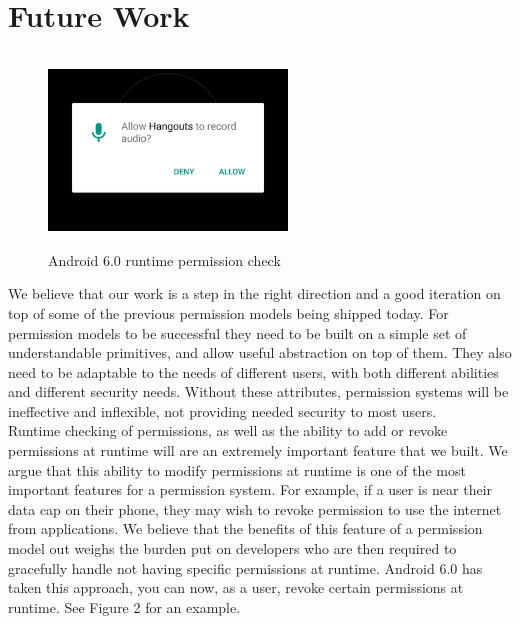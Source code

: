 \section{Future Work}\label{section:futurework}

\begin{figure}[h]
\centering
\includegraphics[height=2in, width=2.5in]{app.png}
\caption{Android 6.0 runtime permission check}
\end{figure}

We believe that our work is a step in the right direction and a good iteration on top of some of the previous permission models being shipped today. 
For permission models to be successful they need to be built on a simple set of understandable primitives, and allow useful abstraction on top of them.
They also need to be adaptable to the needs of different users, with both different abilities and different security needs.
Without these attributes, permission systems will be ineffective and inflexible, not providing needed security to most users.
\\
Runtime checking of permissions, as well as the ability to add or revoke permissions at runtime will are an extremely important feature that we built. We argue that this ability to modify permissions at runtime is one of the most important features for a permission system. For example, if a user is near their data cap on their phone, they may wish to revoke permission to use the internet from applications. We believe that the benefits of this feature of a permission model out weighs the burden put on developers who are then required to gracefully handle not having specific permissions at runtime. Android 6.0 has taken this approach\cite{android}, you can now, as a user, revoke certain permissions at runtime. See Figure 2 for an example.\\

